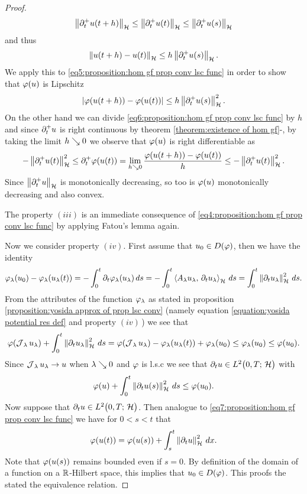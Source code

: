 \begin{proof}
\begin{align*}
		\left\Vert \partial_t^+ u(t+h)\right\Vert_{\mathcal{H}}
		\leq \left\Vert \partial_t^+ u(t)\right\Vert_{\mathcal{H}}
		\leq \left\Vert \partial_t^+ u(s)\right\Vert_{\mathcal{H}}
	\end{align*}
	and thus
	\begin{align*}
		\left\Vert u(t+h)-u(t)\right\Vert_{\mathcal{H}}
		\leq h\left\Vert \partial_t^+ u(s)\right\Vert_{\mathcal{H}}.
	\end{align*}
	We apply this to \eqref{eq5:proposition:hom gf prop conv lsc func} 
	in order to show that $ \varphi(u) $ is Lipschitz
	\begin{align*}
		\left\vert \varphi(u(t+h))-\varphi(u(t))\right\vert
		\leq h\left\Vert \partial_t^+ u(s)\right\Vert_{\mathcal{H}}^2.
	\end{align*}
	On the other hand we can 
	divide \eqref{eq6:proposition:hom gf prop conv lsc func}
	by $ h $ and since $ \partial_t^+ u $ is 
	right continuous by theorem \ref{theorem:existence of hom gf}-,
	by taking the limit $ h\searrow 0 $ we observe that
	$ \varphi(u) $ is right differentiable as
	\begin{align*}
		-\left\Vert \partial_t^+ u(t)\right\Vert_{\mathcal{H}}^2
		\leq \partial_t^+\varphi(u(t))
		=\lim_{h\searrow 0}\frac{\varphi(u(t+h))-\varphi(u(t))}{h}
		\leq-\left\Vert \partial_t^+ u(t)\right\Vert_{\mathcal{H}}^2.
	\end{align*}
	Since $ \left\Vert \partial_t^+ u\right\Vert_{\mathcal{H}}  $ is monotonically
	decreasing, so too is $ \varphi(u) $ monotonically decreasing
	and also convex.\smallskip
	
	The property $ (iii) $ is an immediate consequence
	of \eqref{eq4:proposition:hom gf prop conv lsc func} by
	applying Fatou's lemma again.\smallskip
	
	Now we consider property $ (iv) $. First assume that 
	$ u_0\in D(\varphi) $, then we have the identity
	\begin{align}\label{eq7:proposition:hom gf prop conv lsc func}
		\varphi_\lambda(u_0)-\varphi_\lambda(u_\lambda(t))
		=-\int_0^t \partial_t\varphi_\lambda(u_\lambda)\,ds
		=-\int_0^t\left\langle A_\lambda u_\lambda,\,\partial_t u_\lambda\right\rangle_{\mathcal{H}}\,ds
		=\int_0^t \left\Vert \partial_t u_\lambda\right\Vert_{\mathcal{H}}^2\,ds.
	\end{align}
	From the attributes of the function $ \varphi_\lambda $ as stated
	in proposition \ref{proposition:yosida approx of prop lsc conv}
	(namely equation \eqref{equation:yosida potential res def}
	and property $ (iv)\, $)
	we see that
	\begin{align*}
		\varphi(\operatorname{\mathcal{J}}_\lambda u_\lambda)+\int_0^t \left\Vert \partial_t u_\lambda\right\Vert_{\mathcal{H}}^2\,ds
		=\varphi(\operatorname{\mathcal{J}}_\lambda u_\lambda)-\varphi_\lambda(u_\lambda(t))+\varphi_\lambda(u_0)
		\leq \varphi_\lambda(u_0)
		\leq \varphi(u_0).
	\end{align*}
	Since $ \operatorname{\mathcal{J}}_\lambda u_\lambda \rightarrow u$ when $\lambda\searrow 0 $
	and $ \varphi $ is l.s.c we see that
	$ \partial_t u\in L^{2}\big(0,T;\,\mathcal{H}\big) $ with
	\begin{align*}
		\varphi(u)+\int_0^t \left\Vert \partial_t u(s)\right\Vert_{\mathcal{H}}^2\,ds
		\leq \varphi(u_0).
	\end{align*}
	Now suppose that $ \partial_t u\in L^{2}\big(0,T;\,\mathcal{H}\big) $. Then
	analogue to \eqref{eq7:proposition:hom gf prop conv lsc func} 
	we have for $ 0<s<t $ that
	\begin{align*}
		\varphi(u(t))=\varphi(u(s))+\int_s^t\left\Vert \partial_t u\right\Vert_{\mathcal{H}}^2\, dx.
	\end{align*}
	Note that $ \varphi(u(s))$ remains bounded even if $ s= 0 $. 
	By definition of the domain of a function on a $ \mathbb{R} $-Hilbert space,
	this implies that $ u_0\in D(\varphi) $. This proofs the stated the equivalence
	relation.\smallskip
	

\end{proof}
